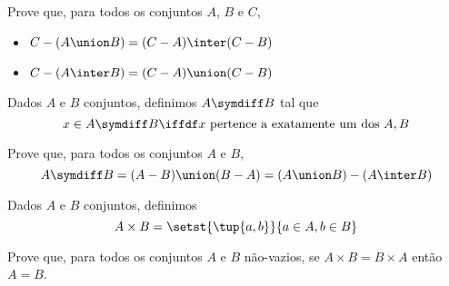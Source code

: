 \begin{exercise}
Prove que, para todos os conjuntos $A$, $B$ e $C$,
\begin{itemize}
   \item $C - (A \union B) = (C - A) \inter (C - B)$
   \item $C - (A \inter B) = (C - A) \union (C - B)$
\end{itemize}
\end{exercise}

\begin{definition}
Dados $A$ e $B$ conjuntos, definimos $A \symdiff B$ tal que
 \[ x \in A \symdiff B \iffdf x \text{ pertence a exatamente um dos } A, B \]
\end{definition}

\begin{exercise}
Prove que, para todos os conjuntos $A$ e $B$,
 \[ A \symdiff B = (A - B) \union (B - A) = (A \union B) - (A \inter B) \]
\end{exercise}

\begin{definition}
Dados $A$ e $B$ conjuntos, definimos
 \[ A \times B = \setst{\tup{a, b}}{a \in A, b \in B} \]
\end{definition}

\begin{exercise}
Prove que, para todos os conjuntos $A$ e $B$ não-vazios, se $A \times B = B \times A$ então $A = B$. 
\end{exercise}
